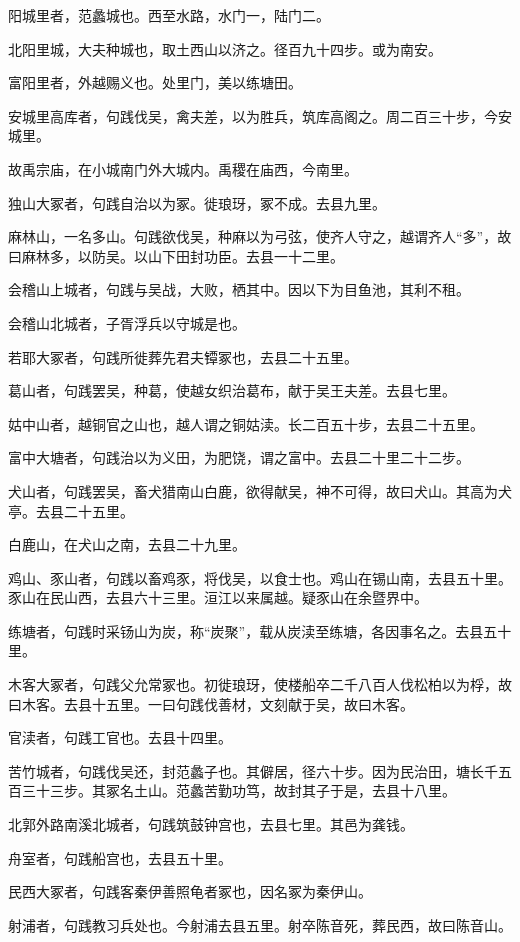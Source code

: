 \documentclass[12pt,UTF8]{ctexbook}
\begin{document}
阳城里者，范蠡城也。西至水路，水门一，陆门二。

北阳里城，大夫种城也，取土西山以济之。径百九十四步。或为南安。

富阳里者，外越赐义也。处里门，美以练塘田。

安城里高库者，句践伐吴，禽夫差，以为胜兵，筑库高阁之。周二百三十步，今安城里。

故禹宗庙，在小城南门外大城内。禹稷在庙西，今南里。

独山大冢者，句践自治以为冢。徙琅玡，冢不成。去县九里。

麻林山，一名多山。句践欲伐吴，种麻以为弓弦，使齐人守之，越谓齐人“多”，故曰麻林多，以防吴。以山下田封功臣。去县一十二里。

会稽山上城者，句践与吴战，大败，栖其中。因以下为目鱼池，其利不租。

会稽山北城者，子胥浮兵以守城是也。

若耶大冢者，句践所徙葬先君夫镡冢也，去县二十五里。

葛山者，句践罢吴，种葛，使越女织治葛布，献于吴王夫差。去县七里。

姑中山者，越铜官之山也，越人谓之铜姑渎。长二百五十步，去县二十五里。

富中大塘者，句践治以为义田，为肥饶，谓之富中。去县二十里二十二步。

犬山者，句践罢吴，畜犬猎南山白鹿，欲得献吴，神不可得，故曰犬山。其高为犬亭。去县二十五里。

白鹿山，在犬山之南，去县二十九里。

鸡山、豕山者，句践以畜鸡豕，将伐吴，以食士也。鸡山在锡山南，去县五十里。豕山在民山西，去县六十三里。洹江以来属越。疑豕山在余暨界中。

练塘者，句践时采钖山为炭，称“炭聚”，载从炭渎至练塘，各因事名之。去县五十里。

木客大冢者，句践父允常冢也。初徙琅玡，使楼船卒二千八百人伐松柏以为桴，故曰木客。去县十五里。一曰句践伐善材，文刻献于吴，故曰木客。

官渎者，句践工官也。去县十四里。

苦竹城者，句践伐吴还，封范蠡子也。其僻居，径六十步。因为民治田，塘长千五百三十三步。其冢名土山。范蠡苦勤功笃，故封其子于是，去县十八里。

北郭外路南溪北城者，句践筑鼓钟宫也，去县七里。其邑为龚钱。

舟室者，句践船宫也，去县五十里。

民西大冢者，句践客秦伊善照龟者冢也，因名冢为秦伊山。

射浦者，句践教习兵处也。今射浦去县五里。射卒陈音死，葬民西，故曰陈音山。
\end{document}
